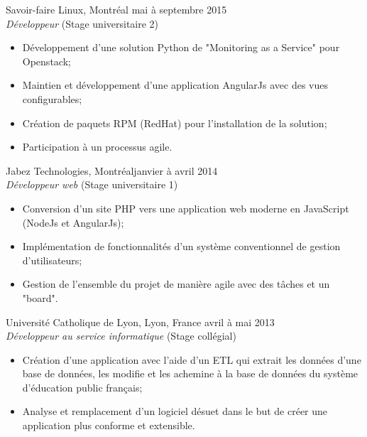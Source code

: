 \documentclass{res}
\begin{document}
\begin{resume}
{	%
	Savoir-faire Linux, Montréal
	\hfill mai à septembre 2015 \\
	{\sl Développeur} \hfill (Stage universitaire 2)
	\vspace{0.05in}

	\begin{itemize} \itemsep -2pt
		\item Développement d'une solution Python de "Monitoring as a Service" pour Openstack;
		\item Maintien et développement d'une application AngularJs avec des vues configurables;
		\item Création de paquets RPM (RedHat) pour l'installation de la solution;
		\item Participation à un processus agile.
	\end{itemize}

	Jabez Technologies, Montréal\footnotemark[\value{footnote}]
	\hfill janvier à avril 2014 \\
	{\sl Développeur web} \hfill (Stage universitaire 1)
	\vspace{0.05in}

	\begin{itemize} \itemsep -2pt
		\item Conversion d’un site PHP vers une application web moderne en JavaScript (NodeJs et AngularJs);
		\item Implémentation de fonctionnalités d’un système conventionnel de gestion d’utilisateurs;
		\item Gestion de l’ensemble du projet de manière agile avec des tâches et un "board".
	\end{itemize}

	Université Catholique de Lyon, Lyon, France
	\hfill avril à mai 2013 \\
	{\sl Développeur au service informatique} \hfill (Stage collégial)
	\vspace{0.05in}

	\begin{itemize} \itemsep -2pt
		\item Création d’une application avec l’aide d’un ETL qui extrait les données d’une base de données, les modifie et les achemine à la base de données du système d’éducation public français;
		\item Analyse et remplacement d’un logiciel désuet dans le but de créer une application plus conforme et extensible.
	\end{itemize}

}
\end{resume}
\end{document}
